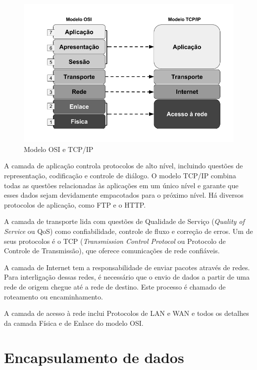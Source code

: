\documentclass[
12pt,				%
openright,			%
oneside,			%
a4paper,			%
brazil,				%
]{abntex2}
\begin{document}
	\begin{figure} [H]
		\centering
		\includegraphics[scale=.5]{figuras/cap2/02ModeloOSIeTCP}
		\caption{\label{fig_2}Modelo OSI e TCP/IP}
	\end{figure}
	
	\par A camada de aplicação controla protocolos de alto nível, incluindo questões de representação, codificação e controle de diálogo. O modelo TCP/IP combina todas as questões relacionadas às aplicações em um único nível e garante que esses dados sejam devidamente empacotados para o próximo nível. Há diversos protocolos de aplicação, como FTP e o HTTP.
	
	\par A camada de transporte lida com questões de Qualidade de Serviço (\textit{Quality of Service} ou QoS) como confiabilidade, controle de fluxo e correção de erros. Um de seus protocolos é o TCP (\textit{Transmission Control Protocol} ou Protocolo de Controle de Transmissão), que oferece comunicações de rede confiáveis. 
	
	\par A camada de Internet tem a responsabilidade de enviar pacotes através de redes. Para interligação dessas redes, é necessário que o envio de dados a partir de uma rede de origem chegue até a rede de destino. Este processo é chamado de roteamento ou encaminhamento.
	
	\par A camada de acesso à rede inclui Protocolos de LAN e WAN e todos os detalhes da camada Física e de Enlace do modelo OSI.
	
	\section{Encapsulamento de dados}
	
\end{document}

